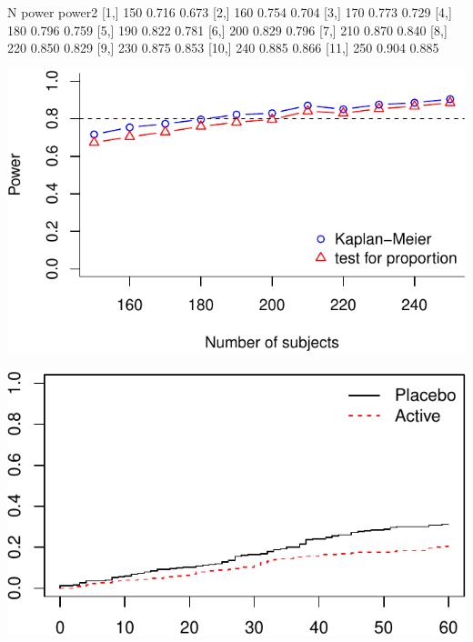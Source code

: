 \documentclass[article]{jss}
\begin{document}
\begin{CodeChunk}

\begin{CodeOutput}
        N power power2
 [1,] 150 0.716  0.673
 [2,] 160 0.754  0.704
 [3,] 170 0.773  0.729
 [4,] 180 0.796  0.759
 [5,] 190 0.822  0.781
 [6,] 200 0.829  0.796
 [7,] 210 0.870  0.840
 [8,] 220 0.850  0.829
 [9,] 230 0.875  0.853
[10,] 240 0.885  0.866
[11,] 250 0.904  0.885
\end{CodeOutput}


\begin{center}\includegraphics{LKmodelJSS_files/figure-latex/power-1} \end{center}



\begin{center}\includegraphics{LKmodelJSS_files/figure-latex/power-2} \end{center}

\end{CodeChunk}
\end{document}
